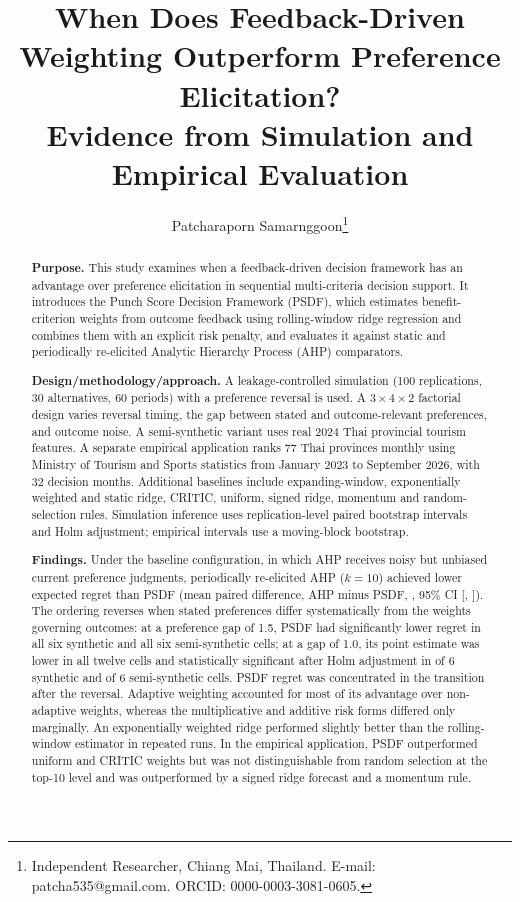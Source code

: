 \documentclass[12pt,a4paper]{article}
\title{When Does Feedback-Driven Weighting Outperform Preference Elicitation?\\
Evidence from Simulation and Empirical Evaluation}
\author{Patcharaporn Samarnggoon\thanks{Independent Researcher, Chiang Mai, Thailand. E-mail: patcha535@gmail.com. ORCID: 0000-0003-3081-0605.}}
\date{}
\begin{document}
\maketitle

\begin{abstract}
\noindent\textbf{Purpose.} This study examines when a feedback-driven decision framework has an advantage over preference elicitation in sequential multi-criteria decision support. It introduces the Punch Score Decision Framework (PSDF), which estimates benefit-criterion weights from outcome feedback using rolling-window ridge regression and combines them with an explicit risk penalty, and evaluates it against static and periodically re-elicited Analytic Hierarchy Process (AHP) comparators.

\medskip\noindent\textbf{Design/methodology/approach.} A leakage-controlled simulation (100 replications, 30 alternatives, 60 periods) with a preference reversal is used. A $3\times4\times2$ factorial design varies reversal timing, the gap between stated and outcome-relevant preferences, and outcome noise. A semi-synthetic variant uses real 2024 Thai provincial tourism features. A separate empirical application ranks 77 Thai provinces monthly using Ministry of Tourism and Sports statistics from January 2023 to September 2026, with 32 decision months. Additional baselines include expanding-window, exponentially weighted and static ridge, CRITIC, uniform, signed ridge, momentum and random-selection rules. Simulation inference uses replication-level paired bootstrap intervals and Holm adjustment; empirical intervals use a moving-block bootstrap.

\medskip\noindent\textbf{Findings.} Under the baseline configuration, in which AHP receives noisy but unbiased current preference judgments, periodically re-elicited AHP ($k=10$) achieved lower expected regret than PSDF (mean paired difference, AHP minus PSDF, \DiffAHPTen, 95\% CI [\DiffAHPTenLo, \DiffAHPTenHi]). The ordering reverses when stated preferences differ systematically from the weights governing outcomes: at a preference gap of 1.5, PSDF had significantly lower regret in all six synthetic and all six semi-synthetic cells; at a gap of 1.0, its point estimate was lower in all twelve cells and statistically significant after Holm adjustment in \SynPosSigOne{} of 6 synthetic and \SemiPosSigOne{} of 6 semi-synthetic cells. PSDF regret was concentrated in the transition after the reversal. Adaptive weighting accounted for most of its advantage over non-adaptive weights, whereas the multiplicative and additive risk forms differed only marginally. An exponentially weighted ridge performed slightly better than the rolling-window estimator in repeated runs. In the empirical application, PSDF outperformed uniform and CRITIC weights but was not distinguishable from random selection at the top-10 level and was outperformed by a signed ridge forecast and a momentum rule.


\end{abstract}
\end{document}
